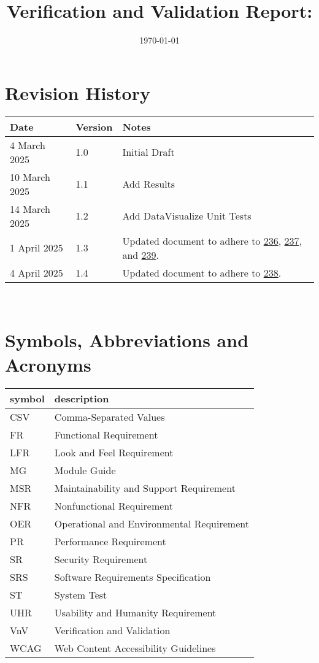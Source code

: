\documentclass[12pt, titlepage]{article}
\begin{document}
\title{Verification and Validation Report: \progname} 
\author{\authname}
\date{\today}
	
\maketitle


\section{Revision History}

\begin{tabularx}{\textwidth}{p{3cm}p{2cm}X} \toprule {\bf Date} & {\bf Version}
& {\bf Notes}\\
\midrule
4 March 2025 & 1.0 & Initial Draft\\
10 March 2025 & 1.1 & Add Results\\
14 March 2025 & 1.2 & Add DataVisualize Unit Tests\\
1 April 2025 & 1.3 & Updated document to adhere to
\href{https://github.com/SumanyaG/Alkalytics/issues/236}{236},
\href{https://github.com/SumanyaG/Alkalytics/issues/237}{237}, and
\href{https://github.com/SumanyaG/Alkalytics/issues/239}{239}. \\
4 April 2025 & 1.4 & Updated document to adhere to 
\href{https://github.com/SumanyaG/Alkalytics/issues/238}{238}. \\
\bottomrule
\end{tabularx}

~\newpage

\section{Symbols, Abbreviations and Acronyms}

\renewcommand{\arraystretch}{1.2}
\begin{tabular}{l l} 
  \toprule		
  \textbf{symbol} & \textbf{description}\\
  \midrule
  CSV & Comma-Separated Values\\
  FR & Functional Requirement\\
  LFR & Look and Feel Requirement\\
  MG & Module Guide\\
  MSR & Maintainability and Support Requirement\\
  NFR & Nonfunctional Requirement\\
  OER & Operational and Environmental Requirement\\
  PR & Performance Requirement\\
  SR & Security Requirement\\
  SRS & Software Requirements Specification\\
  ST & System Test\\
  UHR & Usability and Humanity Requirement\\
  VnV & Verification and Validation\\
  WCAG & Web Content Accessibility Guidelines\\
  \bottomrule
\end{tabular}\\
\end{document}
